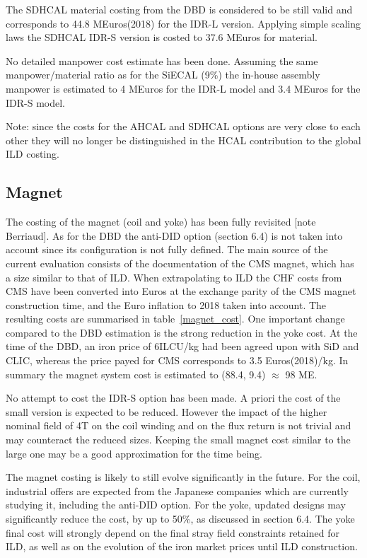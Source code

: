 The SDHCAL material costing from the DBD is considered to be still valid and corresponds to 44.8 MEuros(2018) for the IDR-L version. Applying simple scaling laws the SDHCAL IDR-S version is costed to 37.6 MEuros for material.

No detailed manpower cost estimate has been done. Assuming the same manpower/material ratio as for the SiECAL (9\%) the in-house assembly manpower is estimated to 4 MEuros for the IDR-L model and 3.4 MEuros for the IDR-S model.

Note: since the costs for the AHCAL and SDHCAL options are very close to each other they will no longer be distinguished in the HCAL contribution to the global ILD costing.

\subsection{Magnet}
The costing of the magnet (coil and yoke) has been fully revisited [note Berriaud]. As for the DBD the anti-DID option (section 6.4) is not taken into account since its configuration is not fully defined. The main source of the current evaluation consists of the documentation of the CMS magnet, which has a size similar to that of ILD. When extrapolating to ILD the CHF costs from CMS have been converted into Euros at the exchange parity of the CMS magnet construction time, and the Euro inflation to 2018 taken into account. The resulting costs are summarised in table~\ref{magnet_cost}. One important change compared to the DBD estimation is the strong reduction in the yoke cost. At the time of the DBD, an iron price of 6ILCU/kg had been agreed upon with SiD and CLIC, whereas the price payed for CMS corresponds to 3.5 Euros(2018)/kg. 
In summary the magnet system cost is estimated to (88.4, 9.4) $\approx$ 98 ME.

No attempt to cost the IDR-S option has been made. A priori the cost of the small version is expected to be reduced. However the impact of the higher nominal field of 4T on the coil winding and on the flux return is not trivial and may counteract the reduced sizes. Keeping the small magnet cost similar to the large one may be a good approximation for the time being.

The magnet costing is likely to still evolve significantly in the future. For the coil, industrial offers are expected from the Japanese companies which are currently studying it, including the anti-DID option. For the yoke, updated designs may significantly reduce the cost, by up to 50\%, as discussed in section 6.4. The yoke final cost will strongly depend on the final stray field constraints retained for ILD, as well as on the evolution of the iron market prices until ILD construction.

